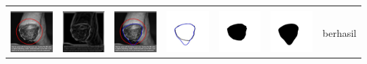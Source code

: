 \begin{table}[H]
\begin{tabular}{|m{0.7in}|m{0.7in}|m{0.7in}|m{0.7in}|m{0.7in}|m{0.7in}|m{0.7in}|}
		&  &  & & & &  \\
		\includegraphics[width=0.7in]{dataset/dataset_3/luka_hitam/ready/4_interp_init.jpg}&
		\includegraphics[width=0.7in]{dataset/dataset_3/luka_hitam/ready/4_interp_ext.jpg}&
		\includegraphics[width=0.7in]{dataset/dataset_3/luka_hitam/ready/4_interp_result.jpg}&
		\includegraphics[width=0.7in]{dataset/dataset_3/luka_hitam/ready/4_gt_r.jpg}&
		\includegraphics[width=0.7in]{dataset/dataset_3/luka_hitam/ready/4_r.jpg}&
		\includegraphics[width=0.7in]{dataset/dataset_3/luka_hitam/ready/4_interp_r.jpg}&
		berhasil\\
		\hline
		

\end{tabular}
\end{table}
